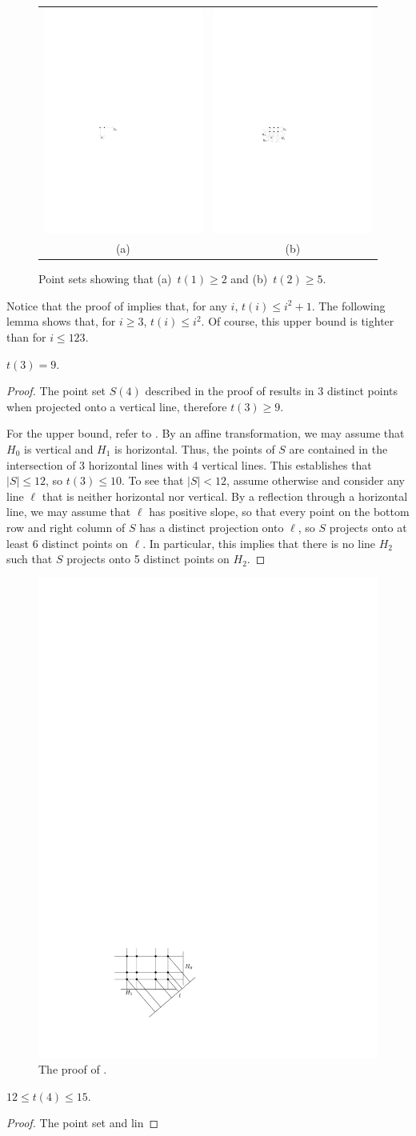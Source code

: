 \documentclass{cccg10}
\begin{document}
\begin{figure}
  \begin{tabular}{cc}
    \includegraphics{i1} & \includegraphics{i2} \\
     (a) & (b)
  \end{tabular}
  \caption{Point sets showing that (a)~$t(1) \ge 2$ and (b)~$t(2) \ge 5$.}
\end{figure}

Notice that the proof of  implies that, for any $i$, $t(i)\le
i^2 + 1$.  The following lemma shows that, for $i\ge 3$, $t(i)\le i^2$.  Of course, this upper bound is tighter than  for $i\le 123$.

\begin{lem}
$t(3)=9$.
\end{lem}

\begin{proof}
The point set $S(4)$ described in the proof of 
results in 3 distinct points when projected onto a vertical line, therefore
$t(3)\ge 9$.

For the upper bound, refer to .  By an affine transformation,
we may assume that $H_0$ is vertical and $H_1$ is horizontal.  Thus, the
points of $S$ are contained in the intersection of 3 horizontal lines
with 4 vertical lines.  This establishes that $|S|\le 12$, so $t(3) \le 10$.
To see that $|S|< 12$, assume otherwise and consider any line $\ell$ that
is neither horizontal nor vertical. By a reflection through a horizontal
line, we may assume that $\ell$ has positive slope, so that every point
on the bottom row and right column of $S$ has a distinct projection
onto $\ell$, so $S$ projects onto at least 6 distinct points on $\ell$.
In particular, this implies that there is no line $H_2$ such that $S$
projects onto 5 distinct points on $H_2$.
\end{proof}
\begin{figure}
  \begin{center}
    \includegraphics{3opt}
  \end{center}
  \caption{The proof of .}
\end{figure}

\begin{lem}
$12 \le t(4) \le 15$.
\end{lem}

\begin{proof}
The point set and lin
\end{proof}
\end{document}
